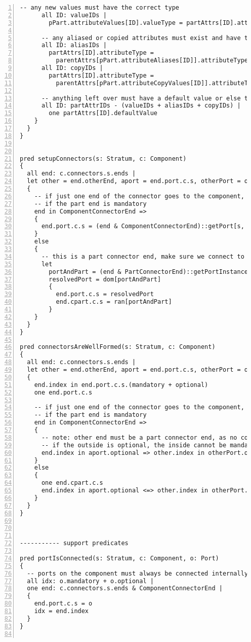 \begin{lstlisting}[caption={wellformed\_components.als}, numbers=left]
      -- any new values must have the correct type
      all ID: valueIDs |
        pPart.attributeValues[ID].valueType = partAttrs[ID].attributeType

      -- any aliased or copied attributes must exist and have the correct type
      all ID: aliasIDs |
        partAttrs[ID].attributeType =
          parentAttrs[pPart.attributeAliases[ID]].attributeType
      all ID: copyIDs |
        partAttrs[ID].attributeType =
          parentAttrs[pPart.attributeCopyValues[ID]].attributeType
        
      -- anything left over must have a default value or else the parts attribute is unspecified
      all ID: partAttrIDs - (valueIDs + aliasIDs + copyIDs) |
        one partAttrs[ID].defaultValue
    }
  }  
} 


pred setupConnectors(s: Stratum, c: Component)
{
  all end: c.connectors.s.ends |
  let other = end.otherEnd, aport = end.port.c.s, otherPort = other.port.c.s |
  {
    -- if just one end of the connector goes to the component, it must be mandatory
    -- if the part end is mandatory
    end in ComponentConnectorEnd =>
    {
      end.port.c.s = (end & ComponentConnectorEnd)::getPort[s, c]
    }
    else
    {
      -- this is a part connector end, make sure we connect to a single port instance
      let
        portAndPart = (end & PartConnectorEnd)::getPortInstance[s, c],
        resolvedPort = dom[portAndPart]
        {
          end.port.c.s = resolvedPort
          end.cpart.c.s = ran[portAndPart]
        }
    }
  }
}

pred connectorsAreWellFormed(s: Stratum, c: Component)
{
  all end: c.connectors.s.ends |
  let other = end.otherEnd, aport = end.port.c.s, otherPort = other.port.c.s |
  {
    end.index in end.port.c.s.(mandatory + optional)
    one end.port.c.s
    
    -- if just one end of the connector goes to the component, it must be mandatory
    -- if the part end is mandatory
    end in ComponentConnectorEnd =>
    {
      -- note: other end must be a part connector end, as no component to component connectors are allowed
      -- if the outside is optional, the inside cannot be mandatory...
      end.index in aport.optional => other.index in otherPort.optional
    }
    else
    {
      one end.cpart.c.s
      end.index in aport.optional <=> other.index in otherPort.optional
    }
  }
}



----------- support predicates

pred portIsConnected(s: Stratum, c: Component, o: Port)
{
  -- ports on the component must always be connected internally
  all idx: o.mandatory + o.optional |
  one end: c.connectors.s.ends & ComponentConnectorEnd |
  {
    end.port.c.s = o
    idx = end.index
  }
}


\end{lstlisting}
